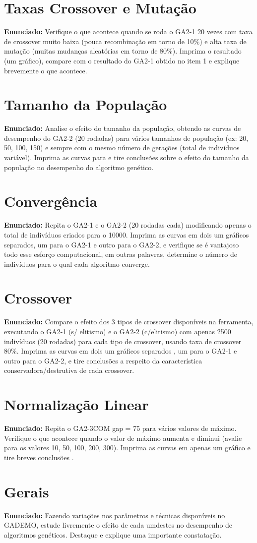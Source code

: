 \documentclass[12pt]{article}
\begin{document}
	
\section{Taxas Crossover e Mutação}
\textbf{Enunciado:}
Verifique o que acontece quando se roda o GA2-1 20 vezes com taxa de crossover muito baixa (pouca recombinação em torno de 10\%) e alta taxa de mutação (muitas mudanças aleatórias em torno de 80\%). Imprima o resultado (um gráfico), compare com o resultado do GA2-1 obtido no item 1 e explique
brevemente o que acontece.

\section{Tamanho da População}
\textbf{Enunciado:}
Analise o efeito do tamanho da população, obtendo as curvas de desempenho do GA2-2 (20 rodadas) para vários tamanhos de população (ex: 20, 50, 100, 150) e sempre com o mesmo número de gerações (total de indivíduos variável). Imprima as curvas para e tire conclusões sobre o efeito do tamanho da população no desempenho do
algoritmo genético.

\section{Convergência}
\textbf{Enunciado:}
Repita o GA2-1 e o GA2-2 (20 rodadas cada) modificando apenas o total de indivíduos criados para o 10000. Imprima as curvas em dois um gráficos separados, um para o GA2-1 e outro para o GA2-2, e verifique se é vantajoso todo esse esforço computacional, em outras palavras, determine o número de
indivíduos para o qual cada algoritmo converge.

\section{Crossover}
\textbf{Enunciado:}
Compare o efeito dos 3 tipos de crossover disponíveis na ferramenta, executando o GA2-1 (s/ elitismo) e o GA2-2 (c/elitismo) com apenas 2500 indivíduos (20 rodadas) para cada tipo de crossover, usando taxa de crossover 80\%. Imprima as curvas em dois um gráficos separados , um para o GA2-1 e outro para o GA2-2, e tire conclusões a respeito da característica conservadora/destrutiva de cada crossover.


\section{Normalização Linear}
\textbf{Enunciado:}
Repita o GA2-3COM gap = 75 para vários valores de máximo. Verifique o que acontece quando o valor de máximo aumenta e diminui (avalie para os valores 10, 50, 100, 200, 300). Imprima as curvas em apenas um gráfico e tire breves conclusões .

\section{Gerais}
\textbf{Enunciado:}
Fazendo variações nos parâmetros e técnicas disponíveis no GADEMO, estude livremente o efeito de cada umdestes no desempenho de algoritmos genéticos. Destaque e explique uma importante constatação.

	 
	
\end{document}
